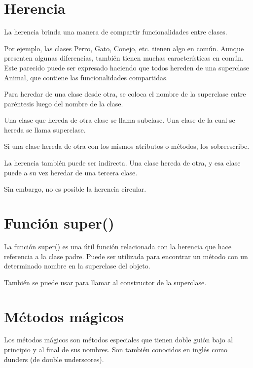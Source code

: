 \documentclass{report}
\begin{document}

\section{Herencia}

La herencia brinda una manera de compartir funcionalidades entre clases.

Por ejemplo, las clases Perro, Gato, Conejo, etc. tienen algo en común. Aunque presenten algunas diferencias, también tienen muchas características en común. Este parecido puede ser expresado haciendo que todos hereden de una superclase Animal, que contiene las funcionalidades compartidas.

Para heredar de una clase desde otra, se coloca el nombre de la superclase entre paréntesis luego del nombre de la clase.


Una clase que hereda de otra clase se llama subclase. Una clase de la cual se hereda se llama superclase.

Si una clase hereda de otra con los mismos atributos o métodos, los sobreescribe.


La herencia también puede ser indirecta. Una clase hereda de otra, y esa clase puede a su vez heredar de una tercera clase.


Sin embargo, no es posible la herencia circular.

\section{Función super()}

La función super() es una útil función relacionada con la herencia que hace referencia a la clase padre. Puede ser utilizada para encontrar un método con un determinado nombre en la superclase del objeto.


También se puede usar para llamar al constructor de la superclase.


\section{Métodos mágicos}

Los métodos mágicos son métodos especiales que tienen doble guión bajo al principio y al final de sus nombres. Son también conocidos en inglés como dunders (de double underscores).
\end{document}
